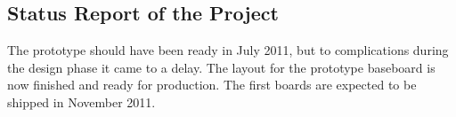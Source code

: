 \documentclass[25pt,halfparskip-,pagesize]{scrartcl}
\begin{document}
\begin{multicols*}{3}
\section{Status Report of the Project}
The prototype should have been ready in July 2011, but to complications during the design phase it came to a delay. The layout for the prototype baseboard is now finished and ready for production. The first boards are expected to be shipped in November 2011. 

\vfill

\end{multicols*}
\end{document}
